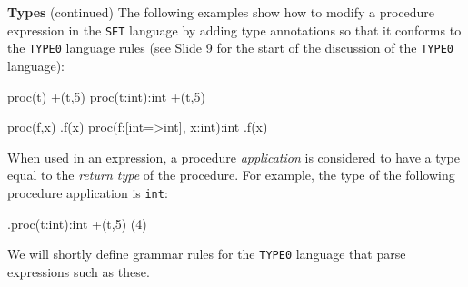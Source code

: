 \begin{minipage}[t]{\sw}
\slidenumber
\LARGE
{\bf Types} (continued)\exx
The following examples show how to modify a procedure expression
in the \verb'SET' language by adding type annotations
so that it conforms to the \verb'TYPE0' language rules
(see Slide 9 for the start of the discussion
of the \verb'TYPE0' language):
\Large
\begin{qv}
proc(t) +(t,5)
proc(t:int):int +(t,5)

proc(f,x) .f(x)
proc(f:[int=>int], x:int):int .f(x)
\end{qv}
\LARGE
When used in an expression, a procedure {\em application}
is considered to have a type equal
to the {\em return type} of the procedure.
For example, the type
of the following procedure application is \verb'int':
\Large
\begin{qv}
.proc(t:int):int +(t,5) (4) %
\end{qv}
\LARGE
We will shortly define grammar rules
for the \verb'TYPE0' language that parse expressions
such as these.
\end{minipage}
